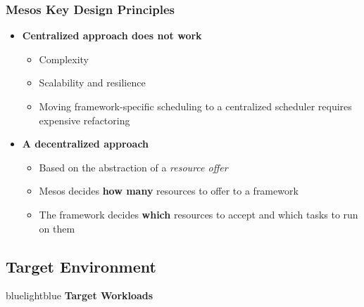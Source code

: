 \begin{frame}
\frametitle{Mesos Key Design Principles}
\begin{itemize}
	\item {\bf Centralized approach does not work}
	\begin{itemize}
		\item Complexity
		\item Scalability and resilience
		\item Moving framework-specific scheduling to a centralized scheduler requires expensive refactoring
	\end{itemize}

	\item {\bf A decentralized approach}
	\begin{itemize}
		\item Based on the abstraction of a {\it resource offer}
		\item Mesos decides {\bf how many} resources to offer to a framework
		\item The framework decides {\bf which} resources to accept and which tasks to run on them
	\end{itemize}
\end{itemize}
\end{frame}

\subsection{Target Environment}
\begin{frame}
 \begin{colorblock}{blue}{lightblue}{ }
    \Large \textbf{Target Workloads}
  \end{colorblock}
\end{frame}

